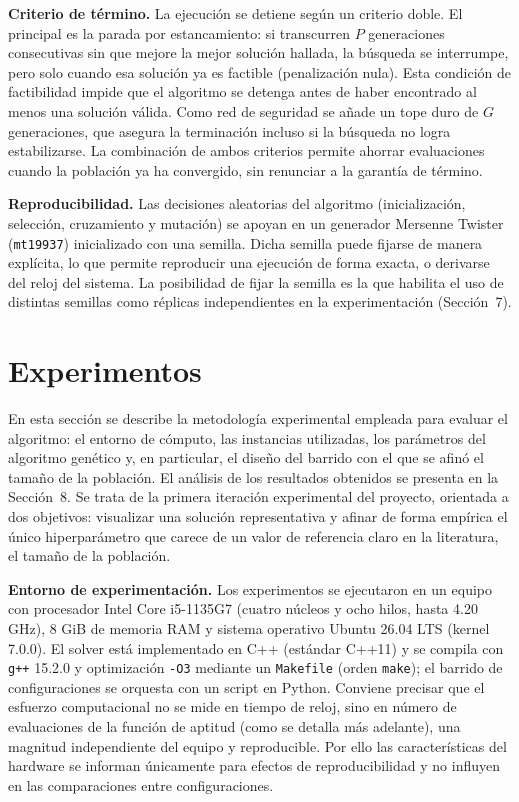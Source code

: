 \documentclass[letter, 10pt]{article}
\begin{document}
\textbf{Criterio de término.} La ejecución se detiene según un criterio doble. El principal es la
parada por estancamiento: si transcurren $P$ generaciones consecutivas sin que mejore la mejor
solución hallada, la búsqueda se interrumpe, pero solo cuando esa solución ya es factible
(penalización nula). Esta condición de factibilidad impide que el algoritmo se detenga antes de
haber encontrado al menos una solución válida. Como red de seguridad se añade un tope duro de $G$
generaciones, que asegura la terminación incluso si la búsqueda no logra estabilizarse. La
combinación de ambos criterios permite ahorrar evaluaciones cuando la población ya ha convergido,
sin renunciar a la garantía de término.

\textbf{Reproducibilidad.} Las decisiones aleatorias del algoritmo (inicialización, selección,
cruzamiento y mutación) se apoyan en un generador Mersenne Twister (\texttt{mt19937}) inicializado
con una semilla. Dicha semilla puede fijarse de manera explícita, lo que permite reproducir una
ejecución de forma exacta, o derivarse del reloj del sistema. La posibilidad de fijar la semilla
es la que habilita el uso de distintas semillas como réplicas independientes en la experimentación
(Sección~7).

\section{Experimentos}

En esta sección se describe la metodología experimental empleada para evaluar el algoritmo: el
entorno de cómputo, las instancias utilizadas, los parámetros del algoritmo genético y, en
particular, el diseño del barrido con el que se afinó el tamaño de la población. El análisis de
los resultados obtenidos se presenta en la Sección~8. Se trata de la primera iteración
experimental del proyecto, orientada a dos objetivos: visualizar una solución representativa y
afinar de forma empírica el único hiperparámetro que carece de un valor de referencia claro en la
literatura, el tamaño de la población.

\textbf{Entorno de experimentación.} Los experimentos se ejecutaron en un equipo con procesador
Intel Core i5-1135G7 (cuatro núcleos y ocho hilos, hasta 4.20 GHz), 8 GiB de memoria RAM y sistema
operativo Ubuntu 26.04 LTS (kernel 7.0.0). El solver está implementado en C++ (estándar C++11) y se
compila con \texttt{g++} 15.2.0 y optimización \texttt{-O3} mediante un \texttt{Makefile}
(orden \texttt{make}); el barrido de configuraciones se orquesta con un script en Python. Conviene
precisar que el esfuerzo computacional no se mide en tiempo de reloj, sino en número de
evaluaciones de la función de aptitud (como se detalla más adelante), una magnitud independiente
del equipo y reproducible. Por ello las características del hardware se informan únicamente para
efectos de reproducibilidad y no influyen en las comparaciones entre configuraciones.
\end{document}
